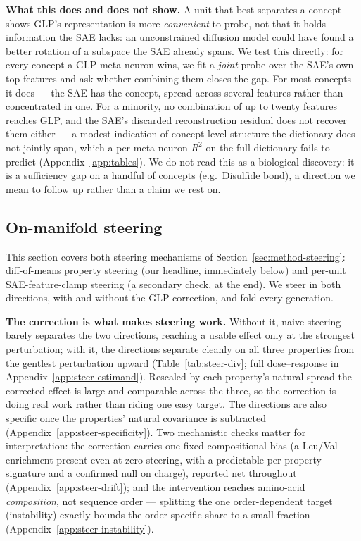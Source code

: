 \documentclass{article}
\begin{document}
\textbf{What this does and does not show.} A unit that best separates a concept shows GLP's
representation is more \emph{convenient} to probe, not that it holds information the SAE lacks:
an unconstrained diffusion model could have found a better rotation of a subspace the SAE
already spans. We test this directly: for every concept a GLP meta-neuron wins, we fit a
\emph{joint} probe over the SAE's own top features and ask whether combining them closes the
gap. For most concepts it does --- the SAE has the concept, spread across several features
rather than concentrated in one. For a minority, no combination of up to twenty features
reaches GLP, and the SAE's discarded reconstruction residual does not recover them either --- a
modest indication of concept-level structure the dictionary does not jointly span, which a
per-meta-neuron $R^2$ on the full dictionary fails to predict (Appendix~\ref{app:tables}). We
do not read this as a biological discovery: it is a sufficiency gap on a handful of concepts
(e.g.\ Disulfide bond), a direction we mean to follow up rather than a claim we rest on.

\subsection{On-manifold steering}
\label{sec:steering-results}

This section covers both steering mechanisms of Section~\ref{sec:method-steering}:
diff-of-means property steering (our headline, immediately below) and per-unit
SAE-feature-clamp steering (a secondary check, at the end). We steer in both directions, with
and without the GLP correction, and fold every generation.

\textbf{The correction is what makes steering work.} Without it, naive steering barely
separates the two directions, reaching a usable effect only at the strongest perturbation; with
it, the directions separate cleanly on all three properties from the gentlest perturbation
upward (Table~\ref{tab:steer-div}; full dose--response in Appendix~\ref{app:steer-estimand}).
Rescaled by each property's natural spread the corrected effect is large and comparable across
the three, so the correction is doing real work rather than riding one easy target. The
directions are also specific once the properties' natural covariance is subtracted
(Appendix~\ref{app:steer-specificity}). Two mechanistic checks matter
for interpretation: the correction carries one fixed compositional bias (a Leu/Val enrichment
present even at zero steering, with a predictable per-property signature and a confirmed null on
charge), reported net throughout (Appendix~\ref{app:steer-drift}); and the intervention reaches
amino-acid \emph{composition}, not sequence order --- splitting the one order-dependent target
(instability) exactly bounds the order-specific share to a small fraction
(Appendix~\ref{app:steer-instability}).
\end{document}
